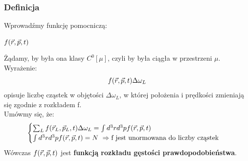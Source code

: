 \subsubsection{Definicja}
Wprowadźmy funkcję pomocniczą:
\begin{center}$f(\vec{r},\vec{p},t)$\end{center}
Żądamy, by była ona klasy $C^0[\mu]$, czyli by była ciągła w przestrzeni $\mu$.
Wyrażenie:
\begin{equation}f(\vec{r},\vec{p},t)\Delta\omega_L\end{equation}
opisuje liczbę cząstek w objętości $\Delta\omega_L$, w której położenia i prędkości zmieniają się zgodnie z rozkładem f.\\
Umówmy się, że:
\begin{equation}
\begin{cases} \sum_L f(\vec{r}_L,\vec{p}_L,t)\Delta\omega_L=\int d^3 r d^3 pf(\vec{r},\vec{p},t) \\ \int d^3r d^3pf(\vec{r},\vec{p},t)=N~\Rightarrow\text{f jest unormowana do liczby cząstek}\end{cases}
\end{equation}
Wówczas $f(\vec{r},\vec{p},t)$ jest \textbf{funkcją rozkładu gęstości prawdopodobieństwa}.
